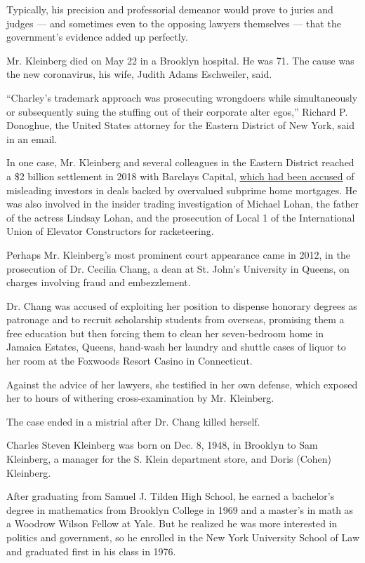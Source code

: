 Typically, his precision and professorial demeanor would prove to juries
and judges --- and sometimes even to the opposing lawyers themselves ---
that the government's evidence added up perfectly.

Mr. Kleinberg died on May 22 in a Brooklyn hospital. He was 71. The
cause was the new coronavirus, his wife, Judith Adams Eschweiler, said.

``Charley's trademark approach was prosecuting wrongdoers while
simultaneously or subsequently suing the stuffing out of their corporate
alter egos,'' Richard P. Donoghue, the United States attorney for the
Eastern District of New York, said in an email.

In one case, Mr. Kleinberg and several colleagues in the Eastern
District reached a \$2 billion settlement in 2018 with Barclays Capital,
\href{https://www.nytimes3xbfgragh.onion/2016/12/22/business/dealbook/justice-department-sues-barclays-mortgage-backed-securities.html}{which
had been accused} of misleading investors in deals backed by overvalued
subprime home mortgages. He was also involved in the insider trading
investigation of Michael Lohan, the father of the actress Lindsay Lohan,
and the prosecution of Local 1 of the International Union of Elevator
Constructors for racketeering.

Perhaps Mr. Kleinberg's most prominent court appearance came in 2012, in
the prosecution of Dr. Cecilia Chang, a dean at St. John's University in
Queens, on charges involving fraud and embezzlement.

Dr. Chang was accused of exploiting her position to dispense honorary
degrees as patronage and to recruit scholarship students from overseas,
promising them a free education but then forcing them to clean her
seven-bedroom home in Jamaica Estates, Queens, hand-wash her laundry and
shuttle cases of liquor to her room at the Foxwoods Resort Casino in
Connecticut.

Against the advice of her lawyers, she testified in her own defense,
which exposed her to hours of withering cross-examination by Mr.
Kleinberg.

The case ended in a mistrial after Dr. Chang killed herself.

Charles Steven Kleinberg was born on Dec. 8, 1948, in Brooklyn to Sam
Kleinberg, a manager for the S. Klein department store, and Doris
(Cohen) Kleinberg.

After graduating from Samuel J. Tilden High School, he earned a
bachelor's degree in mathematics from Brooklyn College in 1969 and a
master's in math as a Woodrow Wilson Fellow at Yale. But he realized he
was more interested in politics and government, so he enrolled in the
New York University School of Law and graduated first in his class in
1976.

